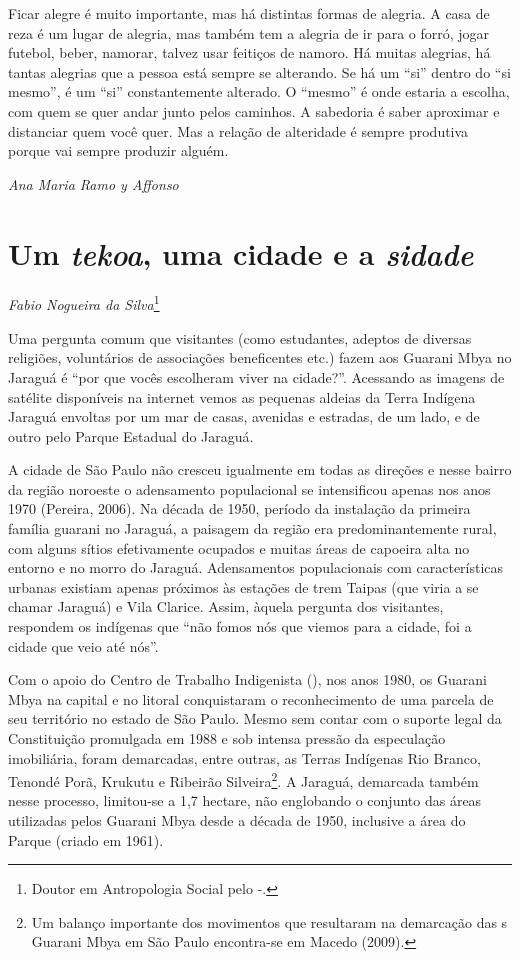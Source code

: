 Ficar alegre é muito importante, mas há distintas formas de alegria. A
casa de reza é um lugar de alegria, mas também tem a alegria de ir para
o forró, jogar futebol, beber, namorar, talvez usar feitiços de namoro.
Há muitas alegrias, há tantas alegrias que a pessoa está sempre se
alterando. Se há um ``si'' dentro do ``si mesmo'', é um ``si'' constantemente
alterado. O ``mesmo'' é onde estaria a escolha, com quem se quer andar
junto pelos caminhos. A sabedoria é saber aproximar e distanciar quem
você quer. Mas a relação de alteridade é sempre produtiva porque vai
sempre produzir alguém.
\medskip
\begin{flushright}
\emph{Ana Maria Ramo y Affonso}
\end{flushright}

\chapter{Um \emph{tekoa}, uma cidade e a \emph{sidade}}
\begin{flushright}
\emph{Fabio Nogueira da Silva}\footnote{Doutor em Antropologia Social pelo
-.}
\end{flushright}
\bigskip

Uma pergunta comum que visitantes (como estudantes, adeptos de diversas
religiões, voluntários de associações beneficentes etc.) fazem aos
Guarani Mbya no Jaraguá é ``por que vocês escolheram viver na cidade?''.
Acessando as imagens de satélite disponíveis na internet vemos as
pequenas aldeias da Terra Indígena Jaraguá envoltas por um mar de
casas, avenidas e estradas, de um lado, e de outro pelo Parque Estadual
do Jaraguá. 

A cidade de São Paulo não cresceu igualmente em todas as direções e
nesse bairro da região noroeste o adensamento populacional se
intensificou apenas nos anos 1970 (Pereira, 2006). Na década de 1950,
período da instalação da primeira família guarani no Jaraguá, a
paisagem da região era predominantemente rural, com alguns sítios
efetivamente ocupados e muitas áreas de capoeira alta no entorno e no
morro do Jaraguá. Adensamentos populacionais com características
urbanas existiam apenas próximos às estações de trem Taipas (que viria
a se chamar Jaraguá) e Vila Clarice. Assim, àquela pergunta dos
visitantes, respondem os indígenas que ``não fomos nós que viemos para a
cidade, foi a cidade que veio até nós''. 

Com o apoio do Centro de Trabalho Indigenista (), nos anos 1980, os
Guarani Mbya na capital e no litoral conquistaram o reconhecimento de
uma parcela de seu território no estado de São Paulo. Mesmo sem contar
com o suporte legal da Constituição promulgada em 1988 e sob intensa
pressão da especulação imobiliária, foram demarcadas, entre outras, as
Terras Indígenas Rio Branco, Tenondé Porã, Krukutu e Ribeirão
Silveira\footnote{Um balanço importante dos movimentos que resultaram
na demarcação das s Guarani Mbya em São Paulo encontra-se em Macedo
(2009).}. A  Jaraguá, demarcada também nesse processo, limitou-se a
1,7 hectare, não englobando o conjunto das áreas utilizadas pelos
Guarani Mbya desde a década de 1950, inclusive a área do Parque (criado
em 1961).

